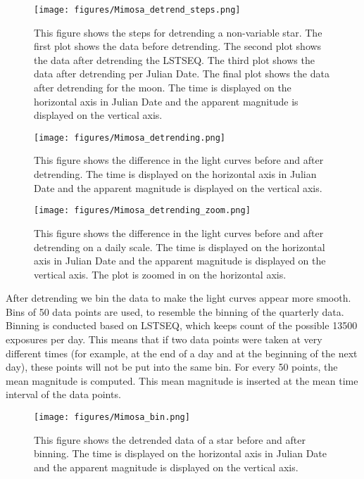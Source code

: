 \documentclass[onecolumn]{aa} %
\begin{document}
\begin{figure}
    \centering
    \texttt{[image: figures/Mimosa\_detrend\_steps.png]}
    \caption{This figure shows the steps for detrending a non-variable star. The first plot shows the data before detrending.
    The second plot shows the data after detrending the LSTSEQ. The third plot shows the data after detrending per Julian Date. The final plot shows the data after detrending for the moon. The time is displayed on the horizontal axis in Julian Date and the apparent magnitude is displayed on the vertical axis.}
    \label{Mimosa_detrend_steps}
\end{figure}
\begin{figure}
    \centering
    \texttt{[image: figures/Mimosa\_detrending.png]}
    \caption{This figure shows the difference in the light curves before and after detrending. The time is displayed on the horizontal axis in Julian Date and the apparent magnitude is displayed on the vertical axis.}
    \label{Mimosa_detrend}
\end{figure}
\begin{figure}
    \centering
    \texttt{[image: figures/Mimosa\_detrending\_zoom.png]}
    \caption{This figure shows the difference in the light curves before and after detrending on a daily scale. The time is displayed on the horizontal axis in Julian Date and the apparent magnitude is displayed on the vertical axis. The plot is zoomed in on the horizontal axis.}
    \label{Mimosa_detrend_zoom}
\end{figure}

After detrending we bin the data to make the light curves appear more smooth. Bins of 50 data points are used, to resemble the binning of the quarterly data. Binning is conducted based on LSTSEQ, which keeps count of the possible 13500 exposures per day. This means that if two data points were taken at very different times (for example, at the end of a day and at the beginning of the next day), these points will not be put into the same bin. For every 50 points, the mean magnitude is computed. This mean magnitude is inserted at the mean time interval of the data points.


\begin{figure}
    \centering
    \texttt{[image: figures/Mimosa\_bin.png]}
    \caption{This figure shows the detrended data of a star before and after binning. The time is displayed on the horizontal axis in Julian Date and the apparent magnitude is displayed on the vertical axis.}
    \label{Mimosa_bin}
\end{figure}
\end{document}
